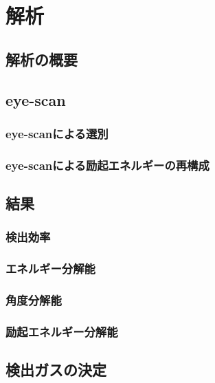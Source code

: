 \chapter{解析}
%
%
%
\section{解析の概要}

\section{eye-scan}
\subsection{eye-scanによる選別}
\subsection{eye-scanによる励起エネルギーの再構成}

\section{結果}
\subsection{検出効率}
\subsection{エネルギー分解能}
\subsection{角度分解能}
\subsection{励起エネルギー分解能}

\section{検出ガスの決定}
